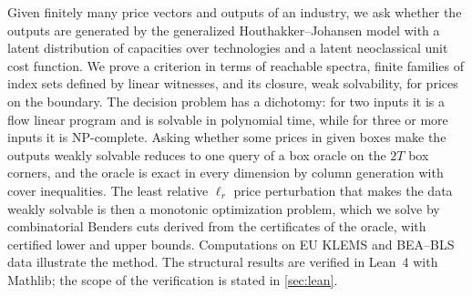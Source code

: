 Given finitely many price vectors and outputs of an industry, we ask whether the outputs are generated by the generalized Houthakker--Johansen model with a latent distribution of capacities over technologies and a latent neoclassical unit cost function. We prove a criterion in terms of reachable spectra, finite families of index sets defined by linear witnesses, and its closure, weak solvability, for prices on the boundary. The decision problem has a dichotomy: for two inputs it is a flow linear program and is solvable in polynomial time, while for three or more inputs it is NP-complete. Asking whether some prices in given boxes make the outputs weakly solvable reduces to one query of a box oracle on the $2T$ box corners, and the oracle is exact in every dimension by column generation with cover inequalities. The least relative $\ell_r$ price perturbation that makes the data weakly solvable is then a monotonic optimization problem, which we solve by combinatorial Benders cuts derived from the certificates of the oracle, with certified lower and upper bounds. Computations on EU KLEMS and BEA--BLS data illustrate the method. The structural results are verified in Lean~4 with Mathlib; the scope of the verification is stated in \cref{sec:lean}.
